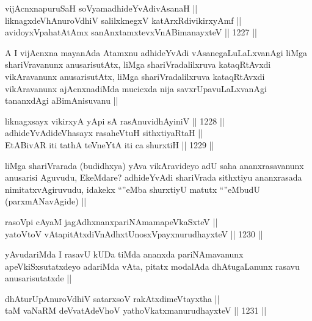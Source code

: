 \begin{shl}
vijAcnxnapuruSaH soV\s yamadhideYvAdivAsanaH || \\
liknagxdeVhAnuroVdhiV salilxknegxV katArxRdivikirxyAmf || \\
avidoyxVpahatAtAmx sanAnxtamxtevxVnABimanayxteV ||  1227 ||  
\end{shl}

\begin{artha}
A I vijAcnxna mayanAda Atamxnu adhideYvAdi vAsanegaLuLaLxvanAgi liMga shariVravanunx anusarisutAtx, liMga shariVradalilxruva kataqRtAvxdi vikAravanunx anusarisutAtx, liMga shariVradalilxruva kataqRtAvxdi vikAravanunx ajAcnxnadiMda mucicxda nija savxrUpavuLaLxvanAgi tananxdAgi aBimAnisuvanu ||
\end{artha}



\begin{shl}
liknagxsayx vikirxyA yA\s pi sA rasAnuvidhAyiniV ||  1228 ||  \\
adhideYvAdideVhasayx rasaheVtuH sithxtiyaRtaH || \\
EtABivAR iti tathA teVneYtA iti ca shurxtiH ||  1229 ||  
\end{shl}

\begin{artha}
liMga shariVrarada (budidhxya) yAva vikAravideyo adU saha ananxrasavanunx anusarisi Aguvudu, EkeMdare? adhideYvAdi shariVrada sithxtiyu ananxrasada nimitatxvAgiruvudu, idakekx ``\stext''eMba shurxtiyU matutx ``\stext''eMbudU (parxmANavAgide) ||
\end{artha}

\begin{shl}
rasoV\s pi cAyaM jagAdhxnanxpariNAmamapeVkaSxteV ||  \\
yatoV\s toV vAtapitAtxdiVnAdhxtUnosxV\s payxnurudhayxteV ||  1230 ||  
\end{shl}

\begin{artha}
yAvudariMda I rasavU kUDa tiMda ananxda pariNAmavanunx apeVkiSxsutatxdeyo adariMda vAta, pitatx modalAda dhAtugaLanunx rasavu anusarisutatxde ||
\end{artha}


\begin{shl}
dhAturUpAnuroVdhiV satarxsoV rakAtxdimeVtayxtha || \\
taM vaNaRM deVvatAdeVhoV yathoVkatxmanurudhayxteV ||  1231 ||  
\end{shl}

